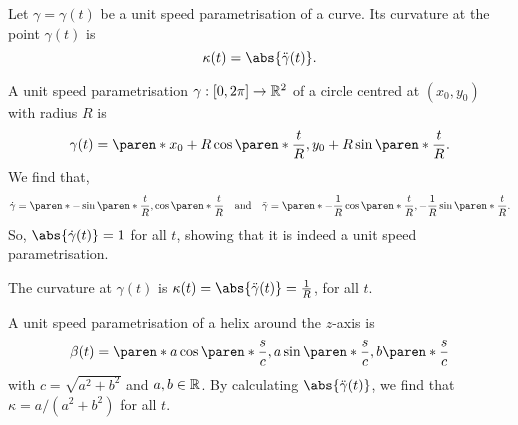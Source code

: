 \documentclass[11pt]{penrose}
\newcommand{\keyword}[1]{\textsf{#1}}
\begin{document}
\begin{ndfn}
    Let $\gamma = \gamma(t)$ be a unit speed parametrisation of a curve. Its \keyword{curvature} at the point $\gamma(t)$ is
    \begin{equation}
        \kappa(t) = \abs{\ddot{\gamma}(t)}.
        \label{eq:curvature-dfn}
    \end{equation}
\end{ndfn}

\begin{egg}
    A unit speed parametrisation $\gamma : [0, 2\pi] \to \mathbb{R}^2$ of a circle centred at $(x_0, y_0)$ with radius $R$ is
    \begin{equation}
        \gamma(t) = \paren*{ x_0 + R \cos\paren*{ \frac{t}{R} }, y_0 + R \sin\paren*{ \frac{t}{R} } }.
    \end{equation}
    We find that,
    \begin{equation}
        \dot{\gamma} = \paren*{ -\sin\paren*{ \frac{t}{R} }, \cos\paren*{ \frac{t}{R} } }
        \quad\text{and}\quad
        \ddot{\gamma} = \paren*{ -\frac{1}{R} \cos\paren*{ \frac{t}{R} }, -\frac{1}{R} \sin\paren*{ \frac{t}{R} } }.
    \end{equation}
    So, $\abs{\dot{\gamma}(t)} = 1$ for all $t$, showing that it is indeed a unit speed parametrisation.

    The curvature at $\gamma(t)$ is $\kappa(t) = \abs{\ddot{\gamma}(t)} = \frac{1}{R}$, for all $t$.
\end{egg}

\begin{egg}
    A unit speed parametrisation of a helix around the $z$-axis is
    \begin{equation}
        \beta(t) = \paren*{ a \cos\paren*{\frac{s}{c}}, a \sin\paren*{\frac{s}{c}}, b\paren*{\frac{s}{c}} }
    \end{equation}
    with $c = \sqrt{a^2 + b^2}$ and $a, b \in \mathbb{R}$. By calculating $\abs{\ddot{\gamma}(t)}$, we find that $\kappa = a / (a^2 + b^2)$ for all $t$.
\end{egg}
\end{document}
